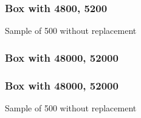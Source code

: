 \documentclass[handout]{beamer}
\begin{document}
   \begin{frame}
   \frametitle{Box with {\color{red} 4800}, {\color{blue} 5200}}
   \begin{center}
   \end{center}
   Sample of 500 without replacement
   \end{frame}



   \begin{frame}
   \frametitle{Box with {\color{red} 48000}, {\color{blue} 52000}}
   \begin{center}
   \end{center}

   \end{frame}



   \begin{frame}
   \frametitle{Box with {\color{red} 48000}, {\color{blue} 52000}}
   \begin{center}
   \end{center}
   Sample of 500 without replacement
   \end{frame}
\end{document}
